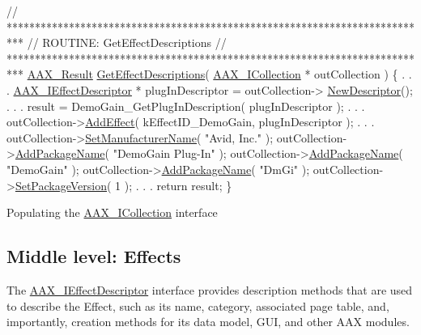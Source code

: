 \begin{DoxyCode}
\textcolor{comment}{// ***************************************************************************}
\textcolor{comment}{// ROUTINE: GetEffectDescriptions}
\textcolor{comment}{// ***************************************************************************}
\hyperlink{a00149_a4d8f69a697df7f70c3a8e9b8ee130d2f}{AAX\_Result} \hyperlink{a00326_gae0d356eef326f77cbb972e48946d4892}{GetEffectDescriptions}( \hyperlink{a00087}{AAX\_ICollection} * 
      outCollection )
\{
                    .
                    .
                    .
    \hyperlink{a00096}{AAX\_IEffectDescriptor} *    plugInDescriptor = outCollection->
      \hyperlink{a00087_afab70588134a065a5b4d6ea6ddd5ddff}{NewDescriptor}();
                    .
                    .
                    .
        result = DemoGain\_GetPlugInDescription( plugInDescriptor );
                    .
                    .
                    .
            outCollection->\hyperlink{a00087_a5ff114b8c4da2081515186f2faf65c8c}{AddEffect}( kEffectID\_DemoGain, plugInDescriptor );
                    .
                    .
                    .
    outCollection->\hyperlink{a00087_a7fbeab9630460b9bf4525512609855f0}{SetManufacturerName}( \textcolor{stringliteral}{"Avid, Inc."} );
    outCollection->\hyperlink{a00087_acf7410e0d06cf64bea36bf7d18b3456c}{AddPackageName}( \textcolor{stringliteral}{"DemoGain Plug-In"} );
    outCollection->\hyperlink{a00087_acf7410e0d06cf64bea36bf7d18b3456c}{AddPackageName}( \textcolor{stringliteral}{"DemoGain"} );
    outCollection->\hyperlink{a00087_acf7410e0d06cf64bea36bf7d18b3456c}{AddPackageName}( \textcolor{stringliteral}{"DmGi"} );      
    outCollection->\hyperlink{a00087_a4e69ac93eaac9c285c2bc3ac5b25880b}{SetPackageVersion}( 1 );     
                    .
                    .
                    .
    \textcolor{keywordflow}{return} result;
\}
\end{DoxyCode}
 Populating the \hyperlink{a00087}{A\+A\+X\+\_\+\+I\+Collection} interface



 \hypertarget{a00326_describe_effects}{}\subsection{Middle level\+: Effects}\label{a00326_describe_effects}
 The \hyperlink{a00096}{A\+A\+X\+\_\+\+I\+Effect\+Descriptor} interface provides description methods that are used to describe the Effect, such as its name, category, associated page table, and, importantly, creation methods for its data model, G\+U\+I, and other A\+A\+X modules.


